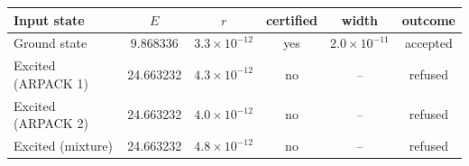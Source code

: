\setlength{\tabcolsep}{2pt}
\begin{tabular}{lccccc}
\toprule
Input state & $E$ & $r$ & certified & width & outcome \\
\midrule
Ground state & 9.868336 & $3.3\times10^{-12}$ & yes & $2.0\times10^{-11}$ & accepted \\
Excited (ARPACK 1) & 24.663232 & $4.3\times10^{-12}$ & no & -- & refused \\
Excited (ARPACK 2) & 24.663232 & $4.0\times10^{-12}$ & no & -- & refused \\
Excited (mixture) & 24.663232 & $4.8\times10^{-12}$ & no & -- & refused \\
\bottomrule
\end{tabular}
